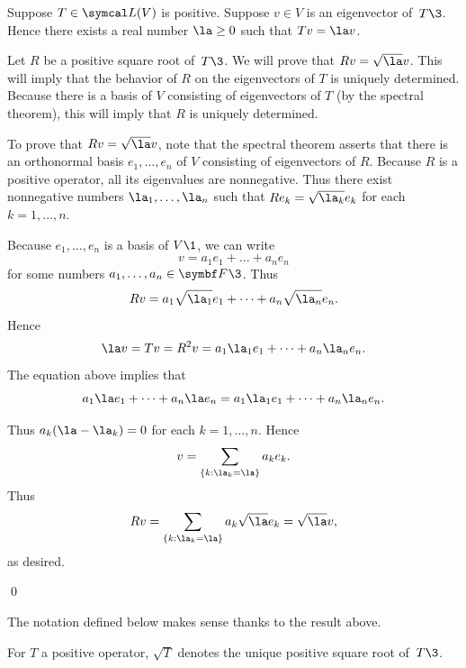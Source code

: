 \proof
Suppose $T \in \L(V)$ is positive. Suppose $v \in V$ is an eigenvector of~$T\3$. Hence there exists a real number $\la \ge 0$ such that
\mbox{$Tv = \la v$}.

Let $R$ be a positive square root of~$T\3$. We will prove that $Rv = \sqrt{\la}v$. This will imply that the behavior of $R$ on the eigenvectors of $T$ is uniquely determined. Because there is a basis of $V$ consisting of eigenvectors of $T$ (by the spectral theorem), this will imply that $R$ is uniquely determined.

To prove that $Rv = \sqrt{\la}v$, note that the spectral theorem asserts that
there is an orthonormal basis $e_1, \dots, e_n$ of $V$ consisting of eigenvectors of $R$. Because $R$ is a positive operator, all its eigenvalues are nonnegative. Thus there exist nonnegative numbers $\la_1, \dots, \la_n$ such that $Re_k = \sqrt{\la_k} e_k$ for each
$k = 1, \dots, n$.

{
\addtolength{\abovedisplayskip}{-1.6bp} %
\addtolength{\belowdisplayskip}{-1.6bp} %

Because $e_1, \dots, e_n$ is a basis of $V\1$, we can write
\[
v = a_1 e_1 + \dots + a_n e_n
\]
for some numbers $a_1, \dots, a_n \in \F{}\3$. Thus
\[
Rv = a_1 \sqrt{\la_1} e_1 + \dots + a_n \sqrt{\la_n} e_n.
\]
Hence
\[
\la v = Tv = R^2v = a_1 \la_1 e_1 + \dots + a_n \la_n e_n.
\]
The equation above implies that
\[
a_1 \la e_1 + \dots + a_n \la e_n = a_1 \la_1 e_1 + \dots + a_n \la_n e_n.
\]

Thus $a_k(\la - \la_k) = 0$ for each $k = 1, \dots, n$. Hence
\[
v = \sum_{\{k:\la_k = \la\}} a_k e_k.
\]
Thus
\[
Rv = \sum_{\{k:\la_k = \la\}} a_k \sqrt{\la} e_k = \sqrt{\la} v,
\]
as desired.}
\qed

The notation defined below makes sense thanks to the result above.

{For $T$ a positive operator, $ \sqrt{T}$ denotes the unique positive square root of~$T\3$.}

